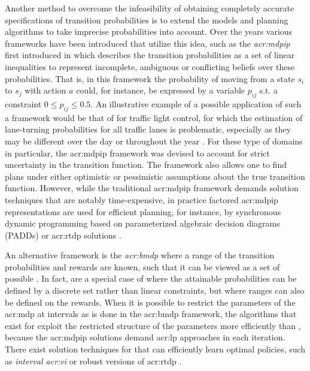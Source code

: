 Another method to overcome the infeasibility of obtaining completely accurate specifications of transition probabilities is to extend the models and planning algorithms to take imprecise probabilities into account.
Over the years various frameworks have been introduced that utilize this idea, such as the \textit{\acrfull{acr:mdpip}} first introduced in \cite{satia1973markovian} which describes the transition probabilities as a set of linear inequalities to represent incomplete, ambiguous or conflicting beliefs over these probabilities.
That is, in this framework the probability of moving from a state $s_i$ to $s_j$ with action $a$ could, for instance, be expressed by a variable $p_{ij}$ s.t. a constraint $0 \leq p_{ij} \leq 0.5$.
An illustrative example of a possible application of such a framework would be that of  for traffic light control, for which the estimation of lane-turning probabilities for all traffic lanes is problematic, especially as they may be different over the day or throughout the year \cite{delgado2011efficient}.
For these type of domains in particular, the \acrshort{acr:mdpip} framework was devised to account for strict uncertainty in the transition function.
The framework also allows one to find plans under either optimistic or pessimistic assumptions about the true transition function.
However, while the traditional \acrshort{acr:mdpip} framework demands solution techniques that are notably time-expensive, in practice factored \acrshort{acr:mdpip} representations are used for efficient planning, for instance, by synchronous dynamic programming based on parameterized algebraic decision diagrams (PADDs) \cite{delgado2011efficient} or \acrshort{acr:rtdp} solutions \cite{delgado2016real}.

An alternative framework is the \textit{\acrfull{acr:bmdp}} where a range of the transition probabilities and rewards are known, such that it can be viewed as a set of possible .
In fact,  are a special case of  where the attainable probabilities can be defined by a discrete set rather than linear constraints, but where ranges can also be defined on the rewards.
When it is possible to restrict the parameters of the \acrshort{acr:mdp} at intervals as is done in the \acrshort{acr:bmdp} framework, the algorithms that exist for  exploit the restricted structure of the parameters more efficiently than , because the \acrshort{acr:mdpip} solutions demand \acrshort{acr:lp} approaches in each iteration.
There exist solution techniques for  that can efficiently learn optimal policies, such as \textit{interval \acrshort{acr:vi}} \cite{givan2000bounded} or robust versions of \acrshort{acr:rtdp} \cite{buffet2005robust}.


